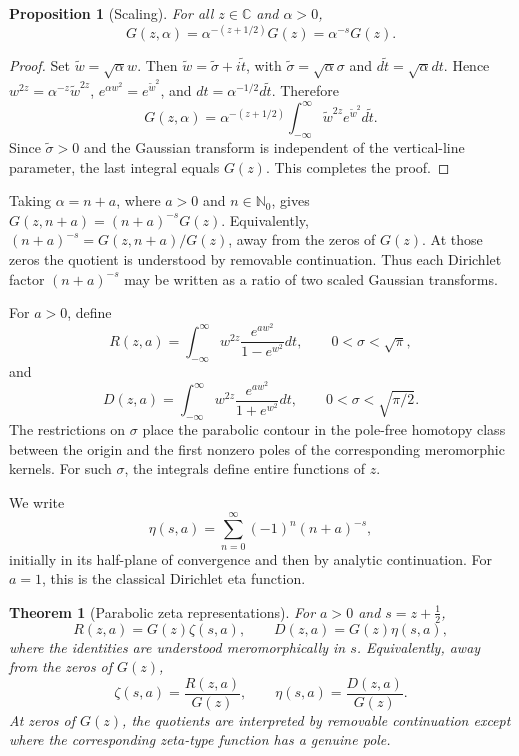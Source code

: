 \documentclass[12pt,english]{article}
\theoremstyle{plain} %
\newtheorem{theorem}{Theorem}
\newtheorem{proposition}{Proposition}
\theoremstyle{remark} %
\begin{document}
\begin{proposition}[Scaling]
\label{prop:G-scaling}
For all $z\in\mathbb{C}$ and $\alpha>0$,
$$
G(z,\alpha)=\alpha^{-(z+1/2)}G(z)=\alpha^{-s}G(z).
$$
\end{proposition}

\begin{proof}
Set $\tilde{w}=\sqrt{\alpha}w$. Then
$\tilde{w}=\tilde{\sigma}+i\tilde{t}$, with
$\tilde{\sigma}=\sqrt{\alpha}\sigma$ and
$d\tilde{t}=\sqrt{\alpha}dt$. Hence
$w^{2z}=\alpha^{-z}\tilde{w}^{2z}$,
$e^{\alpha w^2}=e^{\tilde{w}^2}$, and
$dt=\alpha^{-1/2}d\tilde{t}$.
Therefore
$$
G(z,\alpha)
=
\alpha^{-(z+1/2)}
\int_{-\infty}^{\infty}
\tilde{w}^{2z}e^{\tilde{w}^2}d\tilde{t}.
$$
Since $\tilde{\sigma}>0$ and the Gaussian transform is independent of the
vertical-line parameter, the last integral equals $G(z)$. This completes the proof.
\end{proof}

Taking $\alpha=n+a$, where $a>0$ and $n\in\mathbb{N}_0$, gives
$G(z,n+a)=(n+a)^{-s}G(z)$. 
Equivalently,
$(n+a)^{-s} =
G(z,n+a)/G(z)$, away from the zeros of $G(z)$. At those zeros the quotient is
understood by removable continuation. Thus each Dirichlet factor $(n+a)^{-s}$
may be written as a ratio of two scaled Gaussian transforms.

For $a>0$, define
\begin{equation}
R(z,a)
=
\int_{-\infty}^{\infty}
w^{2z}\frac{e^{aw^2}}{1-e^{w^2}}dt,
\qquad 0<\sigma<\sqrt{\pi},
\label{eq:R-definition}
\end{equation}
and
\begin{equation}
D(z,a)
=
\int_{-\infty}^{\infty}
w^{2z}\frac{e^{aw^2}}{1+e^{w^2}}dt,
\qquad 0<\sigma<\sqrt{\pi/2}.
\label{eq:D-definition}
\end{equation}
The restrictions on $\sigma$ place the parabolic contour in the pole-free
homotopy class between the origin and the first nonzero poles of the
corresponding meromorphic kernels. For such $\sigma$, the integrals define
entire functions of $z$.

We write
$$
\eta(s,a)=\sum_{n=0}^{\infty}(-1)^n(n+a)^{-s},
$$
initially in its half-plane of convergence and then by analytic continuation.
For $a=1$, this is the classical Dirichlet eta function.

\begin{theorem}[Parabolic zeta representations]
\label{thm:parabolic-zeta-representations}
For $a>0$ and $s=z+\tfrac{1}{2}$,
\begin{equation}
R(z,a)=G(z)\zeta(s,a),
\qquad
D(z,a)=G(z)\eta(s,a),
\label{eq:pmt-zeta-factorization}
\end{equation}
where the identities are understood meromorphically in $s$. Equivalently,
away from the zeros of $G(z)$,
$$
\zeta(s,a)=\frac{R(z,a)}{G(z)},
\qquad
\eta(s,a)=\frac{D(z,a)}{G(z)}.
$$
At zeros of $G(z)$, the quotients are interpreted by removable continuation
except where the corresponding zeta-type function has a genuine pole.
\end{theorem}
\end{document}
